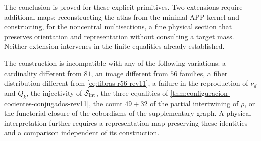 The conclusion is proved for these explicit primitives. Two extensions require additional maps: reconstructing the atlas from the minimal APP kernel and constructing, for the noncentral multisections, a fine physical section that preserves orientation and representation without consulting a target mass. Neither extension intervenes in the finite equalities already established.

The construction is incompatible with any of the following
variations: a cardinality different from \(81\), an image different from \(56\)
families, a fiber distribution different from
\eqref{eq:fibras-r56-rev11}, a failure in the reproduction of
\(\nu_d\) and \(Q_k\), the injectivity of
\(\mathcal S_{\rm int}\), the three equalities of
\cref{thm:configuracion-cocientes-conjugados-rev11}, the count
\(49+32\) of the partial intertwining of \(\rho\), or the functorial closure of
the cobordisms of the supplementary graph. A physical interpretation further requires
a representation map preserving these identities and a
comparison independent of its construction.
